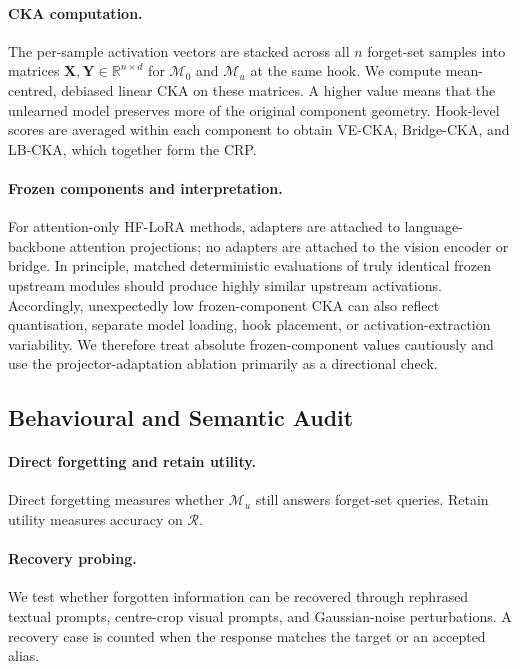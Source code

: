 \documentclass[letterpaper]{article}
\begin{document}
\paragraph{CKA computation.}
The per-sample activation vectors are stacked across all $n$ forget-set
samples into matrices $\mathbf{X},\mathbf{Y}\in\mathbb{R}^{n\times d}$ for
$\mathcal{M}_0$ and $\mathcal{M}_u$ at the same hook. We compute
mean-centred, debiased linear CKA
\citep{kornblith2019cka,nguyen2021dkcka} on these matrices. A higher value
means that the unlearned model preserves more of the original component
geometry. Hook-level scores are averaged within each component to obtain
VE-CKA, Bridge-CKA, and LB-CKA, which together form the CRP.

\paragraph{Frozen components and interpretation.}
For attention-only HF-LoRA methods, adapters are attached to language-backbone
attention projections; no adapters are attached to the vision encoder or
bridge. In principle, matched deterministic evaluations of truly identical
frozen upstream modules should produce highly similar upstream activations.
Accordingly, unexpectedly low frozen-component CKA can also reflect
quantisation, separate model loading, hook placement, or activation-extraction
variability. We therefore treat absolute frozen-component values cautiously
and use the projector-adaptation ablation primarily as a directional check.

\subsection{Behavioural and Semantic Audit}

\paragraph{Direct forgetting and retain utility.}
Direct forgetting measures whether $\mathcal{M}_u$ still answers forget-set
queries. Retain utility measures accuracy on $\mathcal{R}$.

\paragraph{Recovery probing.}
We test whether forgotten information can be recovered through rephrased
textual prompts, centre-crop visual prompts, and Gaussian-noise perturbations.
A recovery case is counted when the response matches the target or an accepted
alias.
\end{document}
